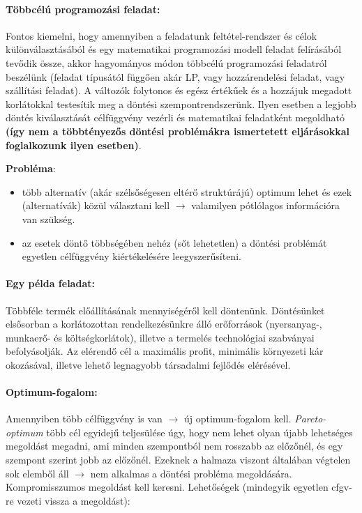 \documentclass[a4paper,12pt]{article}
\begin{document}
\paragraph{Többcélú programozási feladat: }

Fontos kiemelni, hogy amennyiben a feladatunk feltétel-rendszer és célok különválasztásából és egy matematikai programozási modell feladat felírásából tevődik össze, akkor hagyományos módon többcélú programozási feladatról beszélünk (feladat típusától függően akár LP, vagy hozzárendelési feladat, vagy szállítási feladat). A változók folytonos és egész értékűek és a hozzájuk megadott korlátokkal       testesítik meg a döntési szempontrendszerünk. Ilyen esetben a legjobb döntés kiválasztását célfüggvény vezérli és matematikai feladatként megoldható \textbf{(így nem a többtényezős döntési problémákra ismertetett eljárásokkal foglalkozunk ilyen esetben)}.

\textbf{Probléma}:
\begin{itemize}
\item több alternatív (akár szélsőségesen eltérő struktúrájú) optimum lehet és ezek (alternatívák) közül választani kell $\rightarrow$ valamilyen pótlólagos információra van szükség.
\item az esetek döntő többségében nehéz (sőt lehetetlen) a döntési problémát egyetlen célfüggvény kiértékelésére leegyszerűsíteni.
\end{itemize}
  
\paragraph{ Egy példa feladat: } Többféle termék előállításának mennyiségéről kell döntenünk. Döntésünket elsősorban a korlátozottan rendelkezésünkre álló erőforrások (nyersanyag-, munkaerő- és költségkorlátok), illetve a termelés technológiai szabványai befolyásolják. Az elérendő cél a maximális profit, minimális környezeti kár okozásával, illetve lehető legnagyobb társadalmi fejlődés elérésével.

\paragraph{ Optimum-fogalom: } Amennyiben több célfüggvény is van $\rightarrow$ új optimum-fogalom kell. \emph{Pareto-optimum} több cél egyidejű teljesülése úgy, hogy nem lehet olyan újabb lehetséges megoldást megadni, ami minden szempontból nem rosszabb az előzőnél, és egy szempont szerint jobb az előzőnél. Ezeknek a halmaza viszont általában végtelen sok elemből áll  $\rightarrow$ nem alkalmas a döntési probléma megoldására. Kompromisszumos megoldást kell keresni. Lehetőségek (mindegyik egyetlen cfgv-re vezeti vissza a megoldást):
\end{document}
